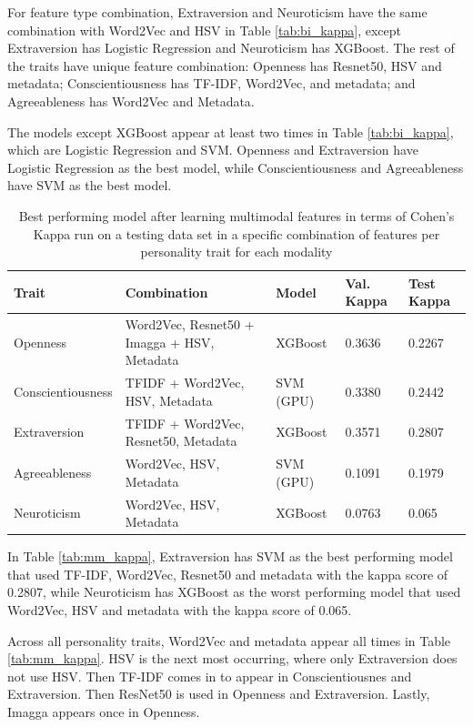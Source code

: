 For feature type combination, Extraversion and Neuroticism have the same combination with Word2Vec and HSV in Table \ref{tab:bi_kappa}, except Extraversion has Logistic Regression and Neuroticism has XGBoost. The rest of the traits have unique feature combination: Openness has Resnet50, HSV and metadata; Conscientiousness has TF-IDF, Word2Vec, and metadata; and Agreeableness has Word2Vec and Metadata. 

The models except XGBoost appear at least two times in Table \ref{tab:bi_kappa}, which are Logistic Regression and SVM. Openness and Extraversion have Logistic Regression as the best model, while Conscientiousness and Agreeableness have SVM as the best model.

\begin{table}[H]
    \centering
    \caption{Best performing model after learning multimodal features in terms of Cohen's Kappa run on a testing data set in a specific combination of features per personality trait for each modality}
    \label{tab:mm_kappa}
    \begin{tabularx}{\textwidth}{l|X|l|l|l}
    \hline
        \textbf{Trait} & \textbf{Combination} & \textbf{Model} & \textbf{Val. Kappa} & \textbf{Test Kappa} \\ \hline
        Openness & Word2Vec, Resnet50 + Imagga + HSV, Metadata & XGBoost & 0.3636 & 0.2267 \\ \hline
        Conscientiousness & TFIDF + Word2Vec, HSV, Metadata & SVM (GPU) & 0.3380 & 0.2442 \\ \hline
        Extraversion & TFIDF + Word2Vec, Resnet50, Metadata & XGBoost & 0.3571 & 0.2807 \\ \hline
        Agreeableness & Word2Vec, HSV, Metadata & SVM (GPU) & 0.1091 & 0.1979 \\ \hline
        Neuroticism & Word2Vec, HSV, Metadata & XGBoost & 0.0763 & 0.065 \\ \hline
    \end{tabularx}
    \label{bestcohenmodel}
\end{table}

In Table \ref{tab:mm_kappa}, Extraversion has SVM as the best performing model that used TF-IDF, Word2Vec, Resnet50 and metadata with the kappa score of 0.2807, while Neuroticism has XGBoost as the worst performing model that used Word2Vec, HSV and metadata with the kappa score of 0.065.

Across all personality traits, Word2Vec and metadata appear all times in Table \ref{tab:mm_kappa}. HSV is the next most occurring, where only Extraversion does not use HSV. Then TF-IDF comes in to appear in Conscientiousnes and Extraversion. Then ResNet50 is used in Openness and Extraversion. Lastly, Imagga appears once in Openness.

